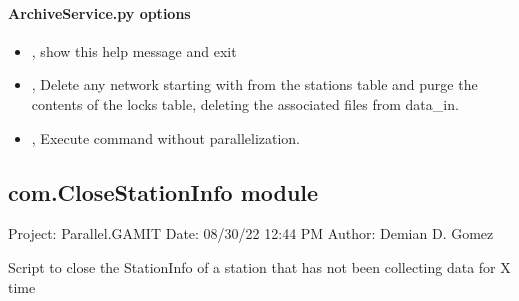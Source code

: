 \documentclass[letterpaper,10pt,english]{sphinxmanual}
\begin{document}
\paragraph{ArchiveService.py options}
\label{\detokenize{com:ArchiveService.py-options}}\begin{itemize}
\item {} 
\sphinxAtStartPar
{\hyperref[\detokenize{com:ArchiveService.py--h}]{}}, {\hyperref[\detokenize{com:ArchiveService.py---help}]{}} \sphinxhyphen{} show this help message and exit

\item {} 
\sphinxAtStartPar
{\hyperref[\detokenize{com:ArchiveService.py--purge}]{}}, {\hyperref[\detokenize{com:ArchiveService.py---purge_locks}]{}} \sphinxhyphen{} Delete any network starting with  from the stations table and purge the contents of the locks table, deleting the associated files from data\_in.

\item {} 
\sphinxAtStartPar
{\hyperref[\detokenize{com:ArchiveService.py--np}]{}}, {\hyperref[\detokenize{com:ArchiveService.py---noparallel}]{}} \sphinxhyphen{} Execute command without parallelization.

\end{itemize}


\subsection{com.CloseStationInfo module}
\label{\detokenize{com:module-com.CloseStationInfo}}\label{\detokenize{com:com-closestationinfo-module}}
\sphinxAtStartPar
Project: Parallel.GAMIT
Date: 08/30/22 12:44 PM
Author: Demian D. Gomez

\sphinxAtStartPar
Script to close the StationInfo of a station that has not been collecting data for X time
\end{document}
